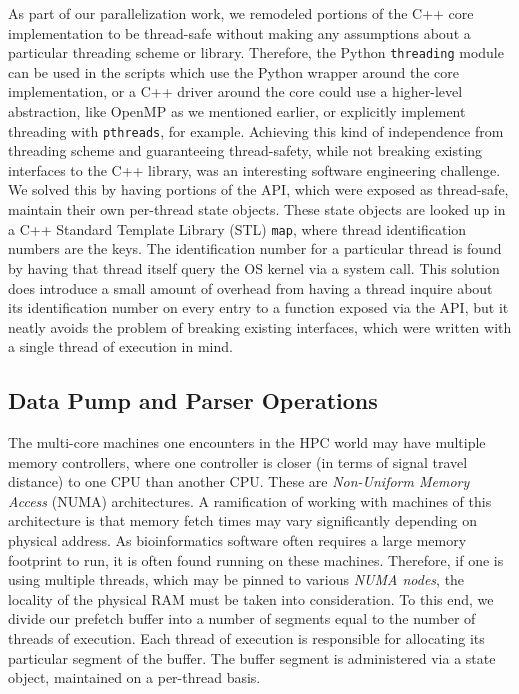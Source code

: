 \documentclass{article}
\begin{document}

As part of our parallelization work, we remodeled portions of the C++ core implementation to be thread-safe without making any assumptions about a particular threading scheme or library. Therefore, the Python \texttt{threading} module can be used in the scripts which use the Python wrapper around the core implementation, or a C++ driver around the core could use a higher-level abstraction, like OpenMP as we mentioned earlier, or explicitly implement threading with \texttt{pthreads}, for example. Achieving this kind of independence from threading scheme and guaranteeing thread-safety, while not breaking existing interfaces to the C++ library, was an interesting software engineering challenge. We solved this by having portions of the API, which were exposed as thread-safe, maintain their own per-thread state objects. These state objects are looked up in a C++ Standard Template Library (STL) \texttt{map}, where thread identification numbers are the keys. The identification number for a particular thread is found by having that thread itself query the OS kernel via a system call. This solution does introduce a small amount of overhead from having a thread inquire about its identification number on every entry to a function exposed via the API, but it neatly avoids the problem of breaking existing interfaces, which were written with a single thread of execution in mind.

\subsection{Data Pump and Parser Operations}

The multi-core machines one encounters in the HPC world may have multiple memory controllers, where one controller is closer (in terms of signal travel distance) to one CPU than another CPU. These are \textit{Non-Uniform Memory Access} (NUMA) architectures. A ramification of working with machines of this architecture is that memory fetch times may vary significantly depending on physical address. As bioinformatics software often requires a large memory footprint to run, it is often found running on these machines. Therefore, if one is using multiple threads, which may be pinned to various \textit{NUMA nodes}, the locality of the physical RAM must be taken into consideration. To this end, we divide our prefetch buffer into a number of segments equal to the number of threads of execution. Each thread of execution is responsible for allocating its particular segment of the buffer. The buffer segment is administered via a state object, maintained on a per-thread basis.
\end{document}
